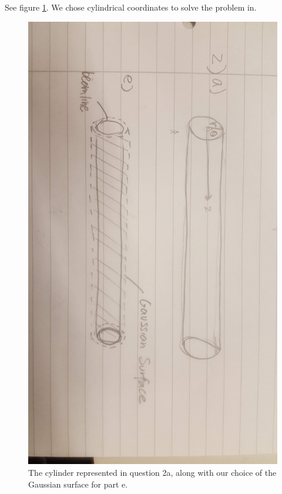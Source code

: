 \documentclass[letterpaper, reqno,11pt]{article}
\begin{document}
 See figure \ref{fig:cylinder}. We chose cylindrical coordinates to solve the problem in. 

\begin{figure}[htbp]
\centering
\includegraphics[width=\textwidth]{images/cylinder.jpg}
\caption{The cylinder represented in question 2a, along with our choice of the Gaussian surface for part e. }
\label{fig:cylinder}
\end{figure}
\end{document}
